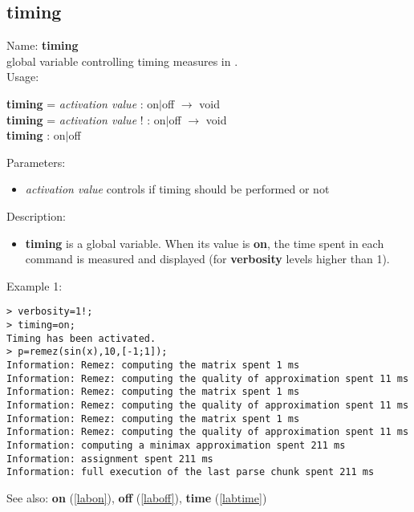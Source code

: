 \subsection{timing}
\label{labtiming}
\noindent Name: \textbf{timing}\\
global variable controlling timing measures in \sollya.\\
\noindent Usage: 
\begin{center}
\textbf{timing} = \emph{activation value} : \textsf{on$|$off} $\rightarrow$ \textsf{void}\\
\textbf{timing} = \emph{activation value} ! : \textsf{on$|$off} $\rightarrow$ \textsf{void}\\
\textbf{timing} : \textsf{on$|$off}\\
\end{center}
Parameters: 
\begin{itemize}
\item \emph{activation value} controls if timing should be performed or not
\end{itemize}
\noindent Description: \begin{itemize}

\item \textbf{timing} is a global variable. When its value is \textbf{on}, the time spent in each 
   command is measured and displayed (for \textbf{verbosity} levels higher than 1).
\end{itemize}
\noindent Example 1: 
\begin{center}\begin{minipage}{15cm}\begin{Verbatim}[frame=single]
> verbosity=1!;
> timing=on;
Timing has been activated.
> p=remez(sin(x),10,[-1;1]);
Information: Remez: computing the matrix spent 1 ms
Information: Remez: computing the quality of approximation spent 11 ms
Information: Remez: computing the matrix spent 1 ms
Information: Remez: computing the quality of approximation spent 11 ms
Information: Remez: computing the matrix spent 1 ms
Information: Remez: computing the quality of approximation spent 11 ms
Information: computing a minimax approximation spent 211 ms
Information: assignment spent 211 ms
Information: full execution of the last parse chunk spent 211 ms
\end{Verbatim}
\end{minipage}\end{center}
See also: \textbf{on} (\ref{labon}), \textbf{off} (\ref{laboff}), \textbf{time} (\ref{labtime})
